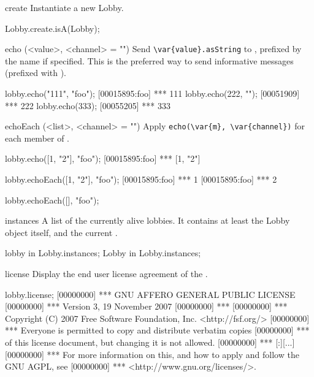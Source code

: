 \begin{urbiscriptapi}
\item[create]
  Instantiate a new Lobby.
\begin{urbiassert}
Lobby.create.isA(Lobby);
\end{urbiassert}


\item[echo](<value>, <channel> = "")%
  Send \lstinline|\var{value}.asString| to \this, prefixed
  by the   name if specified.  This is
  the preferred way to send informative messages (prefixed with
  \samp{***}).
\begin{urbiscript}
lobby.echo("111", "foo");
[00015895:foo] *** 111
lobby.echo(222, "");
[00051909] *** 222
lobby.echo(333);
[00055205] *** 333
\end{urbiscript}


\item[echoEach](<list>, <channel> = "")%
  Apply \lstinline|echo(\var{m}, \var{channel})| for each member  of
  .
\begin{urbiscript}
lobby.echo([1, "2"], "foo");
[00015895:foo] *** [1, "2"]

lobby.echoEach([1, "2"], "foo");
[00015895:foo] *** 1
[00015895:foo] *** 2

lobby.echoEach([], "foo");
\end{urbiscript}




\item[instances]
  A list of the currently alive lobbies.  It contains at least the Lobby
  object itself, and the current .
\begin{urbiassert}
lobby in Lobby.instances;
Lobby in Lobby.instances;
\end{urbiassert}


\item[license]
  Display the end user license agreement of the \usdk.
\begin{urbiscript}
lobby.license;
[00000000] ***                     GNU AFFERO GENERAL PUBLIC LICENSE
[00000000] ***                        Version 3, 19 November 2007
[00000000] ***
[00000000] ***  Copyright (C) 2007 Free Software Foundation, Inc. <http://fsf.org/>
[00000000] ***  Everyone is permitted to copy and distribute verbatim copies
[00000000] ***  of this license document, but changing it is not allowed.
[00000000] ***
[:][...]
[00000000] *** For more information on this, and how to apply and follow the GNU AGPL, see
[00000000] *** <http://www.gnu.org/licenses/>.
\end{urbiscript}



\end{urbiscriptapi}
